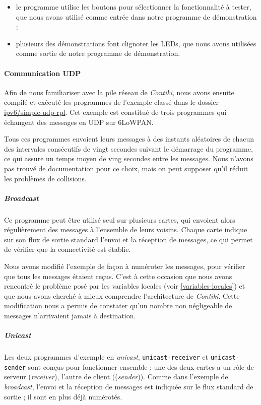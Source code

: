 \begin{itemize}
	\item le programme utilise les boutons pour sélectionner la fonctionnalité à tester, que nous avons utilisé comme entrée dans notre programme de démonstration ;
	\item plusieurs des démonstrations font clignoter les LEDs, que nous avons utilisées comme sortie de notre programme de démonstration.
\end{itemize}

\paragraph{Communication UDP}

Afin de nous familiariser avec la pile réseau de \emph{Contiki}, nous avons ensuite compilé et exécuté les programmes de l’exemple classé dans le dossier \url{ipv6/simple-udp-rpl}.
Cet exemple est constitué de trois programmes qui échangent des messages en UDP sur 6LoWPAN.

Tous ces programmes envoient leurs messages à des instants aléatoires de chacun des intervales consécutifs de vingt secondes suivant le démarrage du programme, ce qui assure un temps moyen de ving secondes entre les messages.
Nous n’avons pas trouvé de documentation pour ce choix, mais on peut supposer qu’il réduit les problèmes de collisions.

\subparagraph{\textit{Broadcast}}

Ce programme peut être utilisé seul sur plusieurs cartes, qui envoient alors régulièrement des messages à l’ensemble de leurs voisins.
Chaque carte indique sur son flux de sortie standard l’envoi et la réception de messages, ce qui permet de vérifier que la connectivité est établie.

Nous avons modifié l’exemple de façon à numéroter les messages, pour vérifier que tous les messages étaient reçus.
C’est à cette occasion que nous avons rencontré le problème posé par les variables locales (voir \cref{variables-locales}) et que nous avons cherché à mieux comprendre l’architecture de \emph{Contiki}.
Cette modification nous a permis de constater qu’un nombre non négligeable de messages n’arrivaient jamais à destination.

\subparagraph{\textit{Unicast}}

Les deux programmes d’exemple en \textit{unicast}, \texttt{unicast-receiver} et \texttt{unicast-sender} sont conçus pour fonctionner ensemble : une des deux cartes a un rôle de serveur (\textit{receiver}), l’autre de client ((\textit{sender})).
Comme dans l’exemple de \textit{broadcast}, l’envoi et la réception de messages est indiquée sur le flux standard de sortie ; il sont en plus déjà numérotés.

